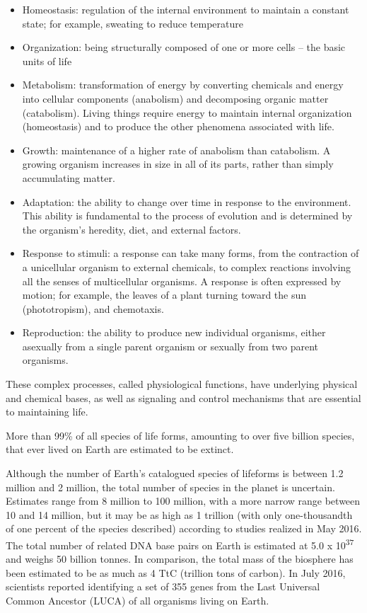 \documentclass[
]{article}
\providecommand{\tightlist}{%
  \setlength{\itemsep}{0pt}\setlength{\parskip}{0pt}}
\begin{document}
\begin{itemize}
\tightlist
\item
  Homeostasis: regulation of the internal environment to maintain a
  constant state; for example, sweating to reduce temperature
\item
  Organization: being structurally composed of one or more cells -- the
  basic units of life
\item
  Metabolism: transformation of energy by converting chemicals and
  energy into cellular components (anabolism) and decomposing organic
  matter (catabolism). Living things require energy to maintain internal
  organization (homeostasis) and to produce the other phenomena
  associated with life.
\item
  Growth: maintenance of a higher rate of anabolism than catabolism. A
  growing organism increases in size in all of its parts, rather than
  simply accumulating matter.
\item
  Adaptation: the ability to change over time in response to the
  environment. This ability is fundamental to the process of evolution
  and is determined by the organism's heredity, diet, and external
  factors.
\item
  Response to stimuli: a response can take many forms, from the
  contraction of a unicellular organism to external chemicals, to
  complex reactions involving all the senses of multicellular organisms.
  A response is often expressed by motion; for example, the leaves of a
  plant turning toward the sun (phototropism), and chemotaxis.
\item
  Reproduction: the ability to produce new individual organisms, either
  asexually from a single parent organism or sexually from two parent
  organisms.
\end{itemize}

These complex processes, called physiological functions, have underlying
physical and chemical bases, as well as signaling and control mechanisms
that are essential to maintaining life.

More than 99\% of all species of life forms, amounting to over five
billion species, that ever lived on Earth are estimated to be extinct.

Although the number of Earth's catalogued species of lifeforms is
between 1.2 million and 2 million, the total number of species in the
planet is uncertain. Estimates range from 8 million to 100 million, with
a more narrow range between 10 and 14 million, but it may be as high as
1 trillion (with only one-thousandth of one percent of the species
described) according to studies realized in May 2016. The total number
of related DNA base pairs on Earth is estimated at 5.0 x
10\textsuperscript{37} and weighs 50 billion tonnes. In comparison, the
total mass of the biosphere has been estimated to be as much as 4 TtC
(trillion tons of carbon). In July 2016, scientists reported identifying
a set of 355 genes from the Last Universal Common Ancestor (LUCA) of all
organisms living on Earth.
\end{document}
